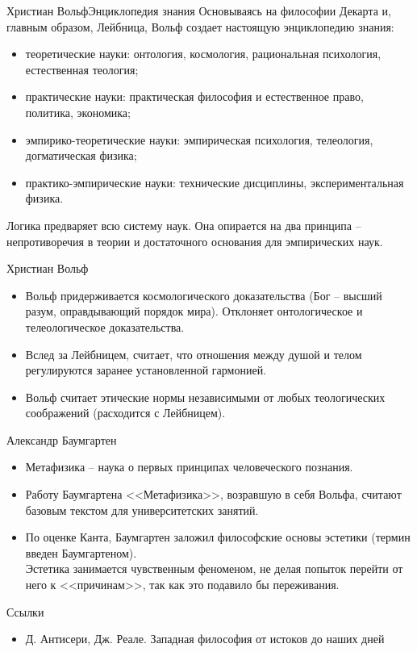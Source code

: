 \documentclass{beamer}
\begin{document}
    \begin{frame}{Христиан Вольф}{Энциклопедия знания}
        Основываясь на философии Декарта и, главным образом, Лейбница,
        Вольф создает настоящую энциклопедию знания:
        \begin{itemize}
        \item теоретические науки: онтология, космология,
            рациональная психология, естественная теология;
        \item практические науки: практическая философия и естественное право,
            политика, экономика;
        \item эмпирико-теоретические науки: эмпирическая психология,
            телеология, догматическая физика;
        \item практико-эмпирические науки: технические дисциплины,
            экспериментальная физика.
        \end{itemize}
        Логика предваряет всю систему наук.
        Она опирается на два принципа -- непротиворечия в теории и
        достаточного основания для эмпирических наук.
    \end{frame}

    \begin{frame}{Христиан Вольф}
        \begin{itemize}
        \item Вольф придерживается космологического доказательства
            (Бог -- высший разум, оправдывающий порядок мира).
            Отклоняет онтологическое и телеологическое доказательства.
        \item Вслед за Лейбницем, считает, что отношения между душой и телом
            регулируются заранее установленной гармонией.
        \item Вольф считает этические нормы независимыми от
            любых теологических соображений (расходится с Лейбницем).
        \end{itemize}
    \end{frame}

    \begin{frame}{Александр Баумгартен}
        \begin{itemize}
        \item Метафизика -- наука о первых принципах человеческого познания.
        \item Работу Баумгартена <<Метафизика>>, возравшую в себя Вольфа,
            считают базовым текстом для университетских занятий.
        \item По оценке Канта, Баумгартен заложил философские основы эстетики
            (термин введен Баумгартеном).\\
            Эстетика занимается чувственным феноменом,
            не делая попыток перейти от него к <<причинам>>,
            так как это подавило бы переживания.
        \end{itemize}
    \end{frame}

    \begin{frame}{Ссылки}
        \begin{itemize}
        \item Д. Антисери, Дж. Реале.
            Западная философия от истоков до наших дней
        \end{itemize}
    \end{frame}
\end{document}
